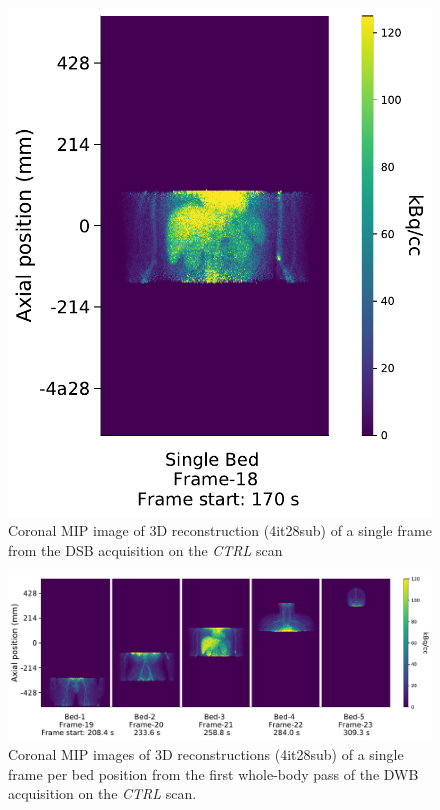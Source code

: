 \begin{figure} [ht!]
\centering
\includegraphics[scale=0.52,angle=0]{3_Results/3_3_DWB_Reconstruction/figures/3_3_IsotoPK_CTRL_DSB_3D.pdf}
\caption{Coronal MIP image of 3D reconstruction (4it28sub) of a single frame from the DSB acquisition on the \textit{CTRL} scan}
\label{fig_3_3:IsotoPK_CTRL_DSB_3D}
\end{figure} 

\begin{figure} [ht!]
\centering
\includegraphics[scale=0.52,angle=0]{3_Results/3_3_DWB_Reconstruction/figures/3_3_IsotoPK_CTRL_DWB_3D.pdf}
\caption{Coronal MIP images of 3D reconstructions (4it28sub) of a single frame per bed position from the first whole-body pass of the DWB acquisition on the \textit{CTRL} scan.}
\label{fig_3_3:IsotoPK_CTRL_DWB_3D}
\end{figure} 

